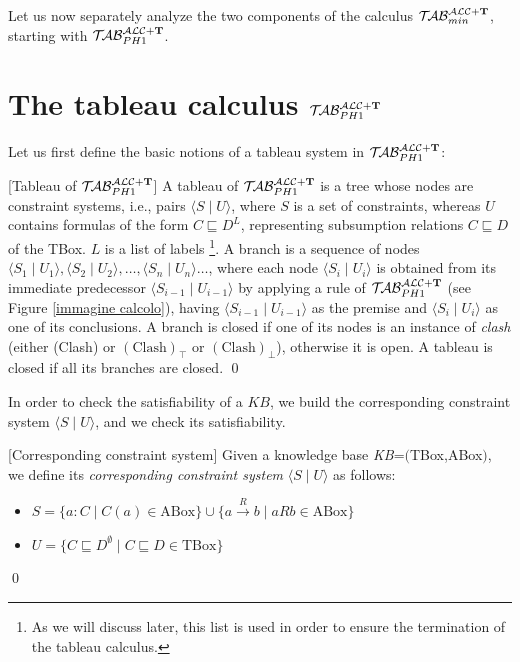 \documentclass[a4paper, 11pt, oneside]{duthesis}
\newcommand{\tip}{{\bf T}}
\newcommand{\unione} {\cup}
\newcommand{\vuoto} {\emptyset}
\newcommand{\tc} {\mid}
\newcommand{\sx} {\langle}
\newcommand{\dx} {\rangle}
\newcommand{\nuovoc}{\mathrel{{\mathcal{T}\!\mathcal{AB}}}_{min}^{\mathcal{ALC}+\mbox{\scriptsize $\tip$}}}
\newcommand{\primo}{\mathrel{{\mathcal{T}\!\mathcal{AB}}}_{PH 1}^{\mathcal{ALC}+\mbox{\scriptsize $\tip$}}}
\newcommand{\trans}[1]{\stackrel{#1}{\longrightarrow}}
\newenvironment{definition}
{\begin{defi} \rm}{\qed \end{defi}}
\newenvironment{definition}
{\begin{defi} \rm}{\qed \end{defi}}
\newtheorem{definition}{Definition}
\newcounter{posu}
\newtheorem{definition}[posu]{Definition}
\begin{document}
Let us now separately analyze the two components of the calculus $\nuovoc$, starting with $\primo$.

\section{The tableau calculus $\primo$}

Let us first define the basic notions of a tableau system in $\primo$:


\begin{definition}[Tableau of $\primo$]\label{deftableau}
A tableau of $\primo$ is a tree whose nodes are constraint systems, i.e., pairs $\sx S \tc U \dx$, where $S$ is a set of constraints, whereas $U$ contains formulas of the form $C \sqsubseteq D^L$, representing subsumption relations $C \sqsubseteq D$ of the TBox.
$L$ is a list of labels
\footnote{As we will discuss later, this list is used in order to ensure the termination of the tableau calculus.}.
A branch is a sequence of nodes $\sx S_1 \tc U_1 \dx, \sx S_2 \tc U_2 \dx, \dots, \sx S_n  \tc U_n \dx \dots$, where each node $\sx S_i \tc U_i \dx$ is obtained from its immediate predecessor $\sx S_{i-1} \tc U_{i-1} \dx$ by applying a rule of $\primo$ (see Figure \ref{immagine calcolo}), having $\sx S_{i-1} \tc U_{i-1} \dx$ as the premise and $\sx S_{i} \tc U_{i} \dx$ as one of its conclusions.
A branch is closed if one of its nodes is an instance of \emph{clash} (either (Clash) or $(\mbox{Clash})_\top$ or $(\mbox{Clash})_\bot$), otherwise it is open.
A tableau is closed if all its branches are closed.
\end{definition}

\noindent In order to check the satisfiability of a $KB$, we build the corresponding constraint system $\sx S \tc U \dx$, and we check its satisfiability.

\begin{definition}[Corresponding constraint system]\label{corresponding constraint system}
Given a knowledge base \emph{KB}=$($TBox,ABox$)$, we define its \emph{corresponding constraint system} $\sx S \tc U \dx$ as follows:

\begin{itemize}
 \item $S=\{a: C \tc C(a) \in \mbox{ABox}\} \unione \{a \trans{R} b \tc a R b \in \mbox{ABox}\}$
 \item $U=\{C \sqsubseteq D^{\vuoto} \tc C \sqsubseteq D \in \mbox{TBox}\}$
\end{itemize}

\end{definition}
\end{document}
